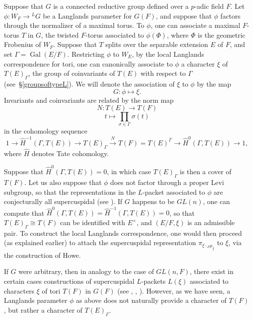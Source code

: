 \documentclass[11pt]{amsart}
\theoremstyle{plain}
\DeclareMathOperator{\Gal}{Gal}
\begin{document}
Suppose that $G$ is a connected reductive group defined over a $p$-adic field $F$.  Let
$\phi : W_F \rightarrow {}^L G$ be a Langlands parameter for $G(F)$, and suppose that $\phi$ factors through the
normalizer of a maximal torus. To $\phi$, one can associate a maximal $F$-torus $T$ in $G$, the twisted $F$-torus associated to $\phi(\Phi)$, where $\Phi$ is the geometric Frobenius  of $W_F$.  Suppose that $T$
splits over the separable  extension $E$ of $F$, and set $\Gamma = \Gal(E/F)$.  Restricting $\phi$ to $W_E$, by the local Langlands correspondence for tori,
one can canonically associate to $\phi$ a character $\xi$ of $T(E)_{\Gamma}$,
the group of coinvariants of $T(E)$ with respect to $\Gamma$ (see~\S\ref{groupsoftypeL}).  We will denote the association of $\xi$ to $\phi$ by the map $$G : \phi \mapsto \xi.$$
Invariants and coinvariants are related by the norm map
$$N : T(E) \rightarrow T(F)$$ $$t \mapsto \displaystyle\prod_{\sigma \in \Gamma} \sigma(t)$$
in the cohomology sequence
$$1 \rightarrow \hat{H}^{-1}(\Gamma,T(E)) \rightarrow T(E)_{\Gamma} \xrightarrow{N} T(F)
= T(E)^{\Gamma} \rightarrow \hat{H}^0(\Gamma,T(E)) \rightarrow 1,$$ where $\hat{H}$ denotes Tate cohomology.

Suppose that $\hat{H}^0(\Gamma, T(E)) = 0$, in which case $T(E)_{\Gamma}$ is then a cover of $T(F)$.  Let us also suppose that $\phi$ does not factor through a proper Levi subgroup, so that the representations in the $L$-packet associated to $\phi$ are conjecturally all supercuspidal (see \cite[\S 3.5]{debackerreeder}).  If $G$ happens to be $GL(n)$, one can compute that $\hat{H}^{0}(\Gamma, T(E)) = \hat{H}^{-1}(\Gamma, T(E)) = 0$, so that $T(E)_{\Gamma} \cong T(F)$ can be identified with $E^{\times}$, and $(E/F, \xi)$ is an admissible pair.  To construct the local Langlands correspondence, one would then proceed (as explained earlier) to attach the supercuspidal representation $\pi_{\xi \cdot {}_F \mu_{\xi}}$ to $\xi$, via the construction of Howe.

If $G$ were arbitrary, then in analogy to the case of $GL(n,F)$, there exist in certain cases constructions of supercuspidal $L$-packets $L(\xi)$ associated to characters $\xi$ of tori $T(F)$ in $G(F)$ (see \cite{debackerreeder}, \cite{kaletha}, \cite{reeder}).  However, as we have seen, a Langlands parameter $\phi$ as above does not naturally provide a character of $T(F)$, but rather a character of $T(E)_{\Gamma}$.
\end{document}
